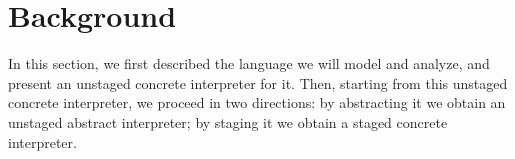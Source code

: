 \newcommand{\TLang}{$L_\lambda$}

\section{Background}

In this section, we first described the language we will model and analyze, and present an unstaged concrete 
interpreter for it. Then, starting from this unstaged concrete interpreter, we proceed in two directions:
by abstracting it we obtain an unstaged abstract interpreter; by staging it we obtain a staged concrete
interpreter.




